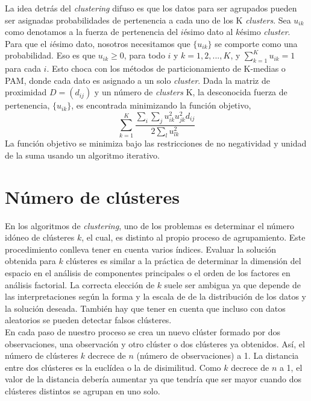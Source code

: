 \documentclass[a4paper, 20pt]{article}
\begin{document}
La idea detrás del \textit{clustering} difuso es que los datos para ser agrupados pueden ser asignadas probabilidades de pertenencia a cada uno de los K \textit{clusters}. Sea $u_{ik}$ como denotamos a la fuerza de pertenencia del $i$ésimo dato al $k$ésimo \textit{cluster}. Para que el $i$ésimo dato, nosotros necesitamos que $\{u_{ik}\}$ se comporte como una probabilidad. Eso es que $u_{ik}\geq0$, para todo $i$ y $k=1,2,...,K$, y $\sum_{k=1}^{K}u_{ik}=1$ para cada $i$. Esto choca con los métodos de particionamiento de K-medias o PAM, donde cada dato es asignado a un solo \textit{cluster}.
Dada la matriz de proximidad $D=(d_{ij})$ y un número de \textit{clusters} K, la desconocida fuerza de pertenencia, $\{u_{ik}\}$, es encontrada minimizando la función objetivo, $$\sum_{k=1}^{K}\frac{\sum_i\sum_ju_{ik}^2u_{jk}^2d_{ij}}{2\sum_lu_{lk}^2}$$ La función objetivo se minimiza bajo las restricciones de no negatividad y unidad de la suma usando un algoritmo iterativo.


\section{Número de clústeres}\label{sec:num}
En los algoritmos de \textit{clustering}, uno de los problemas es determinar el número idóneo de clústeres $ k $, el cual, es distinto al propio proceso de agrupamiento. Este procedimiento conlleva tener en cuenta varios índices. Evaluar la solución obtenida para $ k $ clústeres es similar a la práctica de determinar la dimensión del espacio en el análisis de componentes principales o el orden de los factores en análisis factorial.
La correcta elección de $ k $ suele ser ambigua ya que depende de las interpretaciones según la forma y la escala de de la distribución de los datos y la solución deseada. También hay que tener en cuenta que incluso con datos aleatorios se pueden detectar falsos clústeres. \\

En cada paso de nuestro proceso se crea un nuevo clúster formado por dos observaciones, una observación y otro clúster o dos clústeres ya obtenidos. Así, el número de clústeres $ k $ decrece de $ n $ (número de observaciones) a 1. La distancia entre dos clústeres es la euclídea o la de disimilitud. %
Como $ k $ decrece de $ n $ a 1, el valor de la distancia debería aumentar ya que tendría que ser mayor cuando dos clústeres distintos se agrupan en uno solo. \\
\end{document}
